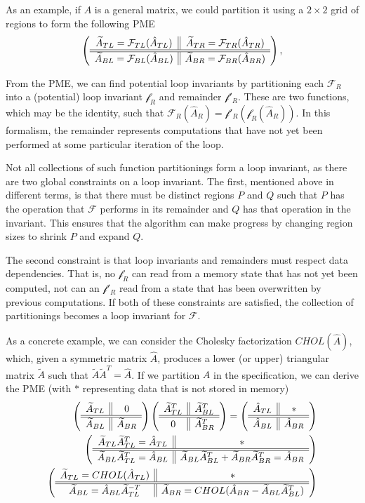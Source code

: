 \documentclass[12pt,letterpaper]{article}
\newcommand*{\opF}{\mathcal{F}}
\newcommand*{\opf}{\mathcal{f}}
\begin{document}
As an example, if $A$ is a general matrix, we could partition it using a $2 \times 2$ grid of regions to form the following PME
\begin{equation*}
  \FlaTwoByTwo{\widetilde{A}_{TL} = \opF_{TL}(\hat{A}_{TL})}{\widetilde{A}_{TR} = \opF_{TR}(\hat{A}_{TR})}
  {\widetilde{A}_{BL} = \opF_{BL}(\hat{A}_{BL})}{\widetilde{A}_{BR} = \opF_{BR}(\hat{A}_{BR})},
\end{equation*}

From the PME, we can find potential loop invariants by partitioning each $\opF_R$ into a (potential) loop invariant $\opf_R$ and remainder $\opf'_R$.
These are two functions, which may be the identity, such that $\opF_R(\hat{A}_R) = \opf'_R(\opf_R(\hat{A}_R))$.
In this formalism, the remainder represents computations that have not yet been performed at some particular iteration of the loop.

Not all collections of such function partitionings form a loop invariant, as there are two global constraints on a loop invariant.
The first,  mentioned above in different terms, is that there must be distinct regions $P$ and $Q$ such that $P$ has the operation that $\opF$ performs in its remainder and $Q$ has that operation in the invariant.
This ensures that the algorithm can make progress by changing region sizes to shrink $P$ and expand $Q$.

The second constraint is that loop invariants and remainders must respect data dependencies.
That is, no $\opf_R$ can read from a memory state that has not yet been computed, not can an $\opf'_R$ read from a state that has been overwritten by previous computations.
If both of these constraints are satisfied, the collection of partitionings becomes a loop invariant for $\opF$.

As a concrete example, we can consider the Cholesky factorization $CHOL(\hat{A})$, which, given a symmetric matrix $\hat{A}$, produces a lower (or upper) triangular matrix $\widetilde{A}$ such that $\widetilde{A}\widetilde{A}^T = \hat{A}$.
If we partition $A$ in the specification, we can derive the PME (with $*$ representing data that is not stored in memory)
\begin{align*}
  \left( \begin{array}{c || c} \widetilde{A}_{TL} & 0 \\ \hline \hline \widetilde{A}_{BL} & \widetilde{A}_{BR} \end{array} \right)
  \left( \begin{array}{c || c} \widetilde{A}_{TL}^T & \widetilde{A}_{BL}^T \\ \hline \hline 0 & \widetilde{A}_{BR}^T \end{array} \right)
  = \left( \begin{array}{c || c} \hat{A}_{TL} & * \\ \hline \hline \hat{A}_{BL} & \hat{A}_{BR} \end{array} \right)\\
  \left( \begin{array}{c || c} \widetilde{A}_{TL}\widetilde{A}_{TL}^T = \hat{A}_{TL} & * \\ \hline \hline \widetilde{A}_{BL}\widetilde{A}_{TL}^T = \hat{A}_{BL} & \widetilde{A}_{BL}\widetilde{A}_{BL}^T + \widetilde{A}_{BR}\widetilde{A}_{BR}^T = \hat{A}_{BR} \end{array} \right)\\
  \left( \begin{array}{c || c} \widetilde{A}_{TL} = CHOL(\hat{A}_{TL}) & * \\ \hline \hline \widetilde{A}_{BL} = \hat{A}_{BL}\widetilde{A}_{TL}^{-T} & \widetilde{A}_{BR} = CHOL(\hat{A}_{BR} - \widetilde{A}_{BL}\widetilde{A}_{BL}^T) \end{array} \right)
\end{align*}
\end{document}
